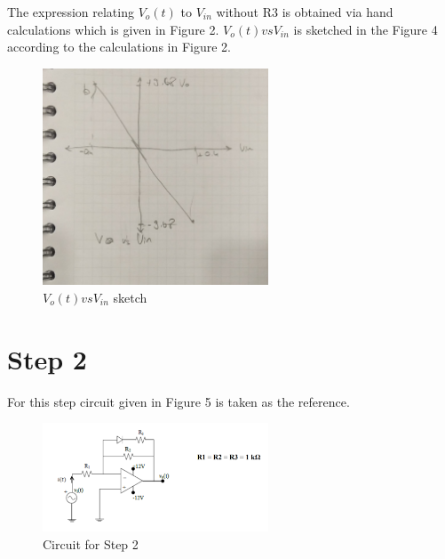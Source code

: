 \documentclass[letterpaper,12pt]{article}
\begin{document}
The expression relating \(V_o(t)\) to \(V_{in}\) without R3 is obtained via hand calculations which is given in Figure 2.
\(V_o(t) vs V_{in}\) is sketched in the Figure 4 according to the calculations in Figure 2.
\begin{figure}[H]
	\centering
   \includegraphics[width=0.6\textwidth]{2_b_sketch.jpeg}
   \caption{\(V_o(t) vs V_{in}\) sketch}
\end{figure} 

\section{Step 2}

For this step circuit given in Figure 5 is taken as the reference.
\begin{figure}[H]
	\centering
   \includegraphics[width=0.6\textwidth]{circuit_2.png}
   \caption{Circuit for Step 2}
\end{figure} 
\end{document}
